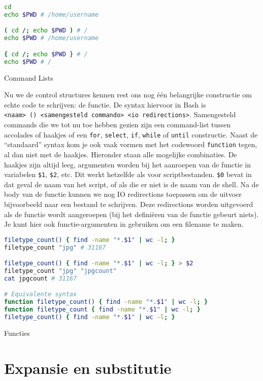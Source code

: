 \begin{listing}
\begin{lstlisting}[language=Bash]
cd
echo $PWD # /home/username

( cd /; echo $PWD ) # /
echo $PWD # /home/username

{ cd /; echo $PWD } # /
echo $PWD # /
\end{lstlisting}
\caption{Command Lists}
\end{listing}

Nu we de control structures kennen rest ons nog één belangrijke constructie om echte code te schrijven: de functie. De syntax hiervoor in Bash is \texttt{\textless{}naam\textgreater{}\ ()\ \textless{}samengesteld\ commando\textgreater{}\ \textless{}io\ redirections\textgreater{}}. Samengesteld commands die we tot nu toe hebben gezien zijn een command-list tussen accolades of haakjes of een \texttt{for}, \texttt{select}, \texttt{if}, \texttt{while} of \texttt{until} constructie. Naast de ``standaard'' syntax kom je ook vaak vormen met het codewoord \texttt{function} tegen, al dan niet met de haakjes. Hieronder staan alle mogelijke combinaties. De haakjes zijn altijd leeg, argumenten worden bij het aanroepen van de functie in variabelen \texttt{\$1}, \texttt{\$2}, etc. Dit werkt hetzelfde als voor scriptbestanden. \texttt{\$0} bevat in dat geval de naam van het script, of als die er niet is de naam van de shell. Na de body van de functie kunnen we nog IO redirections toepassen om de uitvoer bijvoorbeeld naar een bestand te schrijven. Deze redirections worden uitgevoerd als de functie wordt aangeroepen (bij het definiëren van de functie gebeurt niets). Je kunt hier ook functie-argumenten in gebruiken om een filename te maken.

\begin{listing}
\begin{lstlisting}[language=Bash]
filetype_count() { find -name "*.$1" | wc -l; }
filetype_count "jpg" # 31167

filetype_count() { find -name "*.$1" | wc -l; } > $2
filetype_count "jpg" "jpgcount"
cat jpgcount # 31167

# Equivalente syntax
function filetype_count() { find -name "*.$1" | wc -l; }
function filetype_count { find -name "*.$1" | wc -l; }
filetype_count() { find -name "*.$1" | wc -l; }
\end{lstlisting}
\caption{Functies}
\end{listing}

\section{Expansie en substitutie}\label{expansie-en-substitutie}

